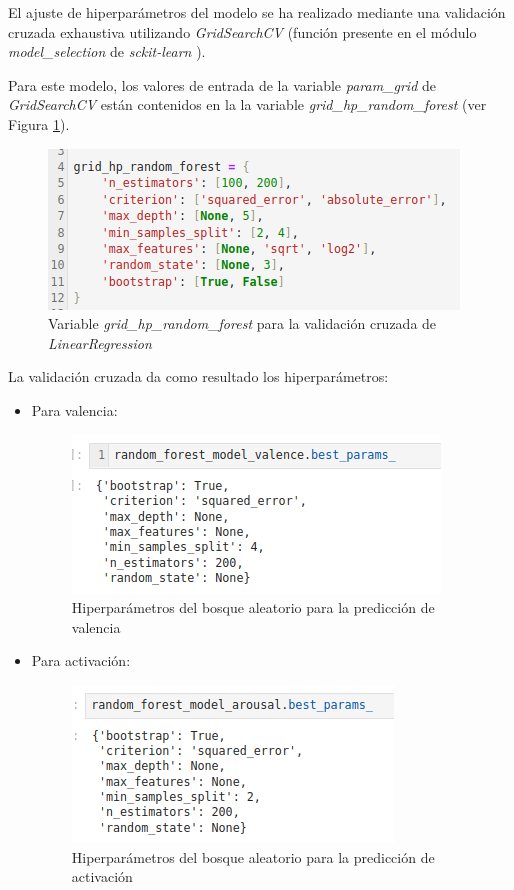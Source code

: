 \documentclass[12pt,a4paper,Spanish]{article}
\begin{document}
El ajuste de hiperparámetros del modelo se ha realizado mediante una validación cruzada exhaustiva utilizando \textit{GridSearchCV} (función presente en el módulo \textit{model\_selection} de \textit{sckit-learn} \cite{scikit-learn}).

Para este modelo, los valores de entrada de la variable \textit{param\_grid} de \textit{GridSearchCV} están contenidos en la la variable \textit{grid\_hp\_random\_forest} (ver Figura \ref{fig:paramsforest}).
\begin{figure}[H]
	\centering
	\includegraphics[width=0.7\linewidth]{figs/params_forest}
	\caption{Variable \textit{grid\_hp\_random\_forest} para la validación cruzada de \textit{LinearRegression}}
	\label{fig:paramsforest}
\end{figure}


La validación cruzada da como resultado los hiperparámetros:
\begin{itemize}
	\item Para valencia:
	\begin{figure}[H]
		\centering
		\includegraphics[width=0.7\linewidth]{figs/final_params_random_forest_valence}
		\caption{Hiperparámetros del bosque aleatorio para la predicción de valencia}
		\label{fig:finalparamsrandomforestvalence}
	\end{figure}
	\item Para activación:
	\begin{figure}[H]
		\centering
		\includegraphics[width=0.7\linewidth]{figs/final_params_random_forest_arousal}
		\caption{Hiperparámetros del bosque aleatorio para la predicción de activación}
		\label{fig:finalparamsrandomforestarousal}
	\end{figure}
\end{itemize}
\end{document}
